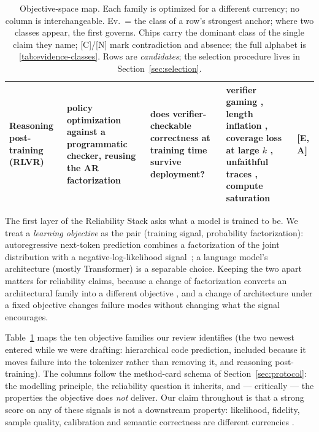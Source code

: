 \documentclass[11pt]{article}
\newcommand{\reliabilitystack}{Reliability Stack}
\begin{document}
\begin{table}[!t]
\begin{tabular}{@{}p{2.5cm}p{3.2cm}p{3.6cm}p{4.2cm}p{0.9cm}@{}}
Reasoning post-training (RLVR) & policy optimization against a programmatic checker, reusing the AR factorization & does verifier-checkable correctness at training time survive deployment? & verifier gaming \cite{id260601066}, length inflation \cite{id250405185}, coverage loss at large $k$ \cite{id250413837}, unfaithful traces \cite{id230504388}, compute saturation \cite{id261019362} & {[E, A]} \\
\bottomrule
\end{tabular}
\caption{Objective-space map. Each family is optimized for a different currency; no column
is interchangeable. Ev.\ = the class of a row's strongest anchor; where two classes appear, the
first governs. Chips carry the dominant class of the single claim they name; [C]/[N] mark
contradiction and absence; the full alphabet is
\cref{tab:evidence-classes}. Rows are \emph{candidates}; the
selection procedure lives in Section~\ref{sec:selection}.}
\label{tab:objspace}
\end{table}

The first layer of the \reliabilitystack{} asks what a model is trained to be. We treat a
\emph{learning objective} as the pair (training signal, probability factorization): autoregressive
next-token prediction combines a factorization of the joint distribution with a negative-log-likelihood
signal~\cite{vaswani2017attention,kaplan2020scaling,hoffmann2022compute}; a language model's
architecture (mostly Transformer) is a separable choice. Keeping the two apart matters for
reliability claims, because a change of factorization converts an architectural family into a
different objective \cite{mdm2025orderar}, and a change of architecture under a fixed objective
changes failure modes without changing what the signal encourages.

Table~\ref{tab:objspace} maps the ten objective families our review identifies (the two newest
entered while we were drafting: hierarchical code prediction, included because it moves failure
into the tokenizer rather than removing it, and reasoning post-training). The columns
follow the method-card schema of Section~\ref{sec:protocol}: the modelling principle, the
reliability question it inherits, and --- critically --- the properties the objective does
\emph{not} deliver. Our claim throughout is that a strong score on any of these signals is not a
downstream property: likelihood, fidelity, sample quality, calibration and semantic correctness are
different currencies \cite{nichol2021improved,acm2023diffusionsurvey,engreports2025modecollapse}.
\end{document}
